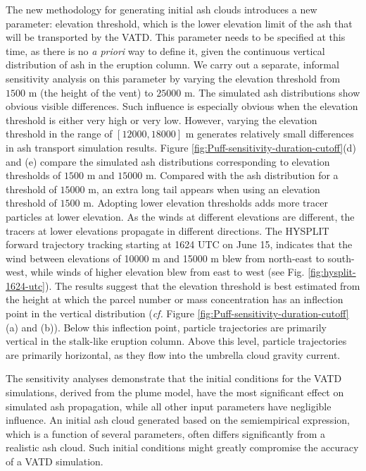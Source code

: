 \documentclass[utf8]{frontiersSCNS} %
\begin{document}
The new methodology for generating initial ash clouds introduces a new parameter: elevation threshold, which is the lower elevation limit of the ash that will be transported by the VATD.  This parameter needs to be specified at this time, as there is no {\it a priori} way to define it, given the continuous vertical distribution of ash in the eruption column. We carry out a separate, informal sensitivity analysis on this parameter by varying the elevation threshold from $1500 $ m (the height of the vent) to $25000 $ m. The simulated ash distributions show obvious visible differences. Such influence is especially obvious when the elevation threshold is either very high or very low. However, varying the elevation threshold in the range of $[12000, 18000] $ m generates relatively small differences in ash transport simulation results.  Figure \ref{fig:Puff-sensitivity-duration-cutoff}(d) and (e) compare the simulated ash distributions corresponding to elevation thresholds of $1500 $ m and $15000 $ m. Compared with the ash distribution for a threshold of $15000 $ m, an extra long tail appears when using an elevation threshold of $1500 $ m. Adopting lower elevation thresholds  adds more tracer particles at lower elevation. As the winds at different elevations are different, the tracers at lower elevations propagate in different directions. The HYSPLIT \citep{stein2015noaa, rolph2017real} forward trajectory tracking starting at 1624 UTC on June 15, indicates that the wind between elevations of 10000 m and 15000 m blew from north-east to south-west, while winds of higher elevation blew from east to west (see Fig. \ref{fig:hysplit-1624-utc}).  The results suggest that the elevation threshold is best estimated from the height at which the parcel number or mass concentration has an inflection point in the vertical distribution ({\it cf.} Figure \ref{fig:Puff-sensitivity-duration-cutoff}(a) and (b)).  Below this inflection point, particle trajectories are primarily vertical in the stalk-like eruption column.  Above this level, particle trajectories are primarily horizontal, as they flow into the umbrella cloud gravity current.   

The sensitivity analyses demonstrate that the initial conditions for the VATD simulations, derived from the plume model, have the most significant effect on simulated ash propagation, while all other input parameters have negligible influence. An initial ash cloud generated based on the semiempirical expression, which is a function of several parameters, often differs significantly  from a realistic ash cloud. Such initial conditions might greatly compromise the accuracy of a VATD simulation.
\end{document}
